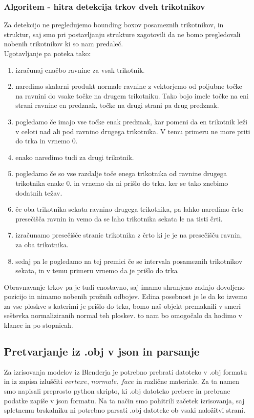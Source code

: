 \documentclass[10pt,a4paper]{article}
\begin{document}
\subsubsection*{Algoritem - hitra detekcija trkov dveh trikotnikov}
Za detekcijo ne pregledujemo bounding boxov posameznih trikotnikov, in struktur, saj smo pri postavljanju strukture zagotovili da ne bomo pregledovali nobenih trikotnikov ki so nam predaleč.\\
Ugotavljanje pa poteka tako:
\begin{enumerate}
\item izračunaj enačbo ravnine za vsak trikotnik. 
\item naredimo skalarni produkt normale ravnine z vektorjemo od poljubne točke na ravnini do vsake točke na drugem trikotniku. Tako bojo imele točke na eni strani ravnine en predznak, točke na drugi strani pa drug predznak.
\item pogledamo če imajo vse točke enak predznak, kar pomeni da en trikotnik leži v celoti nad ali pod ravnino drugega trikotnika. V temu primeru ne more priti do trka in vrnemo 0.
\item enako naredimo tudi za drugi trikotnik.
\item pogledamo če so vse razdalje toče enega trikotnika od ravnine drugega trikotnika enake 0. in vrnemo da ni prišlo do trka. ker se tako znebimo dodatnih težav.
\item če oba trikotnika sekata ravnino drugega trikotnika, pa lahko naredimo črto presečišča ravnin in vemo da se laho trikotnika sekata le na tisti črti.
\item izračunamo presečišče stranic trikotnika z črto ki je je na presečišču ravnin, za oba trikotnika.
\item sedaj pa le pogledamo na tej premici če se intervala posameznih trikotnikov sekata, in v temu primeru vrnemo da je prišlo do trka
\end{enumerate}

Obravnavanje trkov pa je tudi enostavno, saj imamo shranjeno zadnjo dovoljeno pozicijo in nimamo nobenih prožnih odbojev. Edina posebnost je le da ko izvemo za vse ploskve s katerimi je prišlo do trka, bomo naš objekt premaknili v smeri seštevka normaliziranih normal teh ploskev. to nam bo omogočalo da hodimo v klanec in po stopnicah. 

\subsection{Pretvarjanje iz .obj v json in parsanje}
Za izrisovanja modelov iz Blenderja je potrebno prebrati datoteko v .obj formatu in iz zapisa
izluščiti $vertexe$, $normale$, $face$ in različne materiale. Za ta namen smo 
napisali preprosto python skripto, ki .obj datoteko prebere in prebrane podatke 
zapiše v json formatu. Na ta način smo pohitrili začetek izrisovanja, saj spletnemu
brskalniku ni potrebno parsati .obj datoteke ob vsaki naložitvi strani.
\end{document}
